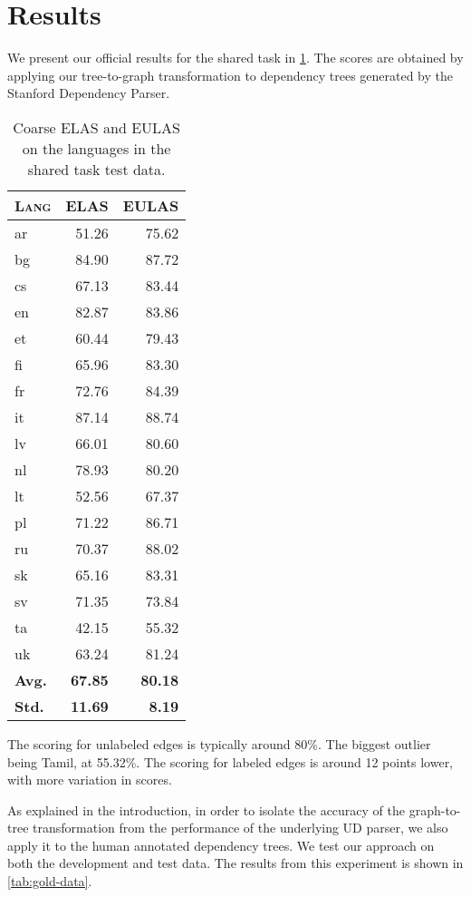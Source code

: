 \documentclass[11pt,a4paper]{article}
\begin{document}
\section{Results}
We present our official results for the shared task in
\cref{tab:test}. The scores are obtained by applying our tree-to-graph
transformation to dependency trees generated by the Stanford
Dependency Parser.

\begin{table}[h]
	\centering
	\begin{tabular}{l|rr}
		\textsc{Lang} & \textsc{ELAS} & \textsc{EULAS} \\
		\hline
		ar  & 51.26 & 75.62 \\
		bg  & 84.90 & 87.72\\
		cs  & 67.13 & 83.44 \\
		en  & 82.87 & 83.86 \\
		et  & 60.44 & 79.43 \\
		fi  & 65.96 & 83.30 \\
		fr  & 72.76 & 84.39 \\
		it  & 87.14 & 88.74 \\
		lv  & 66.01 & 80.60 \\
		nl  & 78.93 & 80.20 \\
		lt  & 52.56 & 67.37 \\
		pl  & 71.22 & 86.71 \\
		ru  & 70.37 & 88.02 \\
		sk  & 65.16 & 83.31 \\
		sv  & 71.35 & 73.84 \\
		ta  & 42.15 & 55.32 \\
		uk  & 63.24 & 81.24 \\
		\textbf{Avg.} & \textbf{67.85} & \textbf{80.18} \\
        \textbf{Std.} & \textbf{11.69} & \textbf{8.19} \\
	\end{tabular}
\caption{\label{tab:test} Coarse ELAS and EULAS on the languages in the shared task test data.}
\end{table}

The scoring for unlabeled edges is typically around 80\%. The biggest
outlier being Tamil, at 55.32\%. The scoring for labeled edges is
around 12 points lower, with more variation in scores.

As explained in the introduction, in order to isolate the accuracy of
the graph-to-tree transformation from the performance of the
underlying UD parser, we also apply it to the human annotated
dependency trees. We test our approach on both the development and
test data. The results from this experiment is shown in
\cref{tab:gold-data}.
\end{document}
